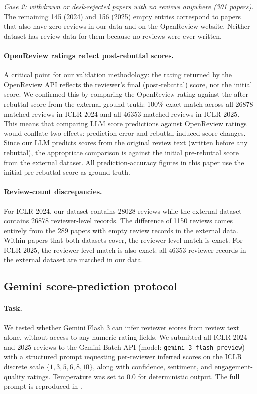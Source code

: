 \documentclass{article}
\newcommand{\code}[1]{\texttt{#1}}
\begin{document}
\textit{Case 2: withdrawn or desk-rejected papers with no reviews anywhere (301 papers).} The remaining 145 (2024) and 156 (2025) empty entries correspond to papers that also have zero reviews in our data and on the OpenReview website. Neither dataset has review data for them because no reviews were ever written.

\paragraph{OpenReview ratings reflect post-rebuttal scores.}
A critical point for our validation methodology: the rating returned by the OpenReview API reflects the reviewer's final (post-rebuttal) score, not the initial score. We confirmed this by comparing the OpenReview rating against the after-rebuttal score from the external ground truth: 100\% exact match across all \num{26878} matched reviews in ICLR 2024 and all \num{46353} matched reviews in ICLR 2025. This means that comparing LLM score predictions against OpenReview ratings would conflate two effects: prediction error and rebuttal-induced score changes. Since our LLM predicts scores from the original review text (written before any rebuttal), the appropriate comparison is against the initial pre-rebuttal score from the external dataset. All prediction-accuracy figures in this paper use the initial pre-rebuttal score as ground truth.

\paragraph{Review-count discrepancies.}
For ICLR 2024, our dataset contains \num{28028} reviews while the external dataset contains \num{26878} reviewer-level records. The difference of \num{1150} reviews comes entirely from the 289 papers with empty review records in the external data. Within papers that both datasets cover, the reviewer-level match is exact. For ICLR 2025, the reviewer-level match is also exact: all \num{46353} reviewer records in the external dataset are matched in our data.

\subsection{Gemini score-prediction protocol}\label{app:gemini-pred}

\paragraph{Task.}
We tested whether Gemini Flash 3 can infer reviewer scores from review text alone, without access to any numeric rating fields. We submitted all ICLR 2024 and 2025 reviews to the Gemini Batch API (model: \code{gemini-3-flash-preview}) with a structured prompt requesting per-reviewer inferred scores on the ICLR discrete scale $\{1, 3, 5, 6, 8, 10\}$, along with confidence, sentiment, and engagement-quality ratings. Temperature was set to 0.0 for deterministic output. The full prompt is reproduced in .
\end{document}
